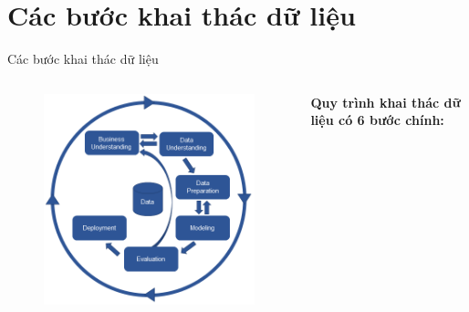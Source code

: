 \documentclass[13spt]{beamer}
\begin{document}
\section{Các bước khai thác dữ liệu}
\begin{frame}{Các bước khai thác dữ liệu}
\transblindshorizontal

 \begin{columns}
 \begin{column}{0.5\textwidth}
	\begin{figure}[h!]
	  \includegraphics[width=1.2\linewidth,height=0.8\textheight,keepaspectratio]{CRISP-DM1.png}
	  \label{fig:writing-thesis}
	\end{figure}
 \end{column}
  \begin{column}{0.5\textwidth}
  \begin{small}

	\textbf{Quy trình khai thác dữ liệu có 6 bước chính: \small} \pause 


\end{small}
\end{column}
\end{columns}
\end{frame}
\end{document}
